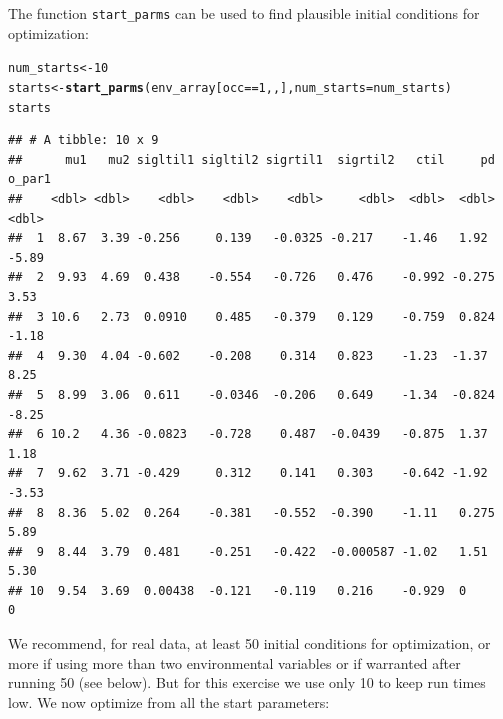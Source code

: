 \documentclass[11pt]{article}\usepackage[]{graphicx}\usepackage[]{xcolor}
\makeatletter
\newcommand{\hlnum}[1]{\textcolor[rgb]{0.686,0.059,0.569}{#1}}%
\newcommand{\hlopt}[1]{\textcolor[rgb]{0,0,0}{#1}}%
\newcommand{\hldef}[1]{\textcolor[rgb]{0.345,0.345,0.345}{#1}}%
\newcommand{\hlkwb}[1]{\textcolor[rgb]{0.69,0.353,0.396}{#1}}%
\newcommand{\hlkwc}[1]{\textcolor[rgb]{0.333,0.667,0.333}{#1}}%
\newcommand{\hlkwd}[1]{\textcolor[rgb]{0.737,0.353,0.396}{\textbf{#1}}}%
\newenvironment{kframe}{%
 \def\at@end@of@kframe{}%
 \ifinner\ifhmode%
  \def\at@end@of@kframe{\end{minipage}}%
  \begin{minipage}{\columnwidth}%
 \fi\fi%
 \def\FrameCommand##1{\hskip\@totalleftmargin \hskip-\fboxsep
 \colorbox{shadecolor}{##1}\hskip-\fboxsep
     \hskip-\linewidth \hskip-\@totalleftmargin \hskip\columnwidth}%
 \MakeFramed {\advance\hsize-\width
   \@totalleftmargin\z@ \linewidth\hsize
   \@setminipage}}%
 {\par\unskip\endMakeFramed%
 \at@end@of@kframe}
\newenvironment{knitrout}{}{} %
\makeatother
\begin{document}
The function \texttt{start\_parms} can be used to find plausible initial conditions
for optimization:
\begin{knitrout}
\color{fgcolor}\begin{kframe}
\begin{alltt}
\hldef{num_starts} \hlkwb{<-} \hlnum{10}
\hldef{starts} \hlkwb{<-} \hlkwd{start_parms}\hldef{(env_array[occ} \hlopt{==} \hlnum{1}\hldef{, , ],} \hlkwc{num_starts} \hldef{= num_starts)}
\hldef{starts}
\end{alltt}
\begin{verbatim}
## # A tibble: 10 x 9
##      mu1   mu2 sigltil1 sigltil2 sigrtil1  sigrtil2   ctil     pd o_par1
##    <dbl> <dbl>    <dbl>    <dbl>    <dbl>     <dbl>  <dbl>  <dbl>  <dbl>
##  1  8.67  3.39 -0.256     0.139   -0.0325 -0.217    -1.46   1.92   -5.89
##  2  9.93  4.69  0.438    -0.554   -0.726   0.476    -0.992 -0.275   3.53
##  3 10.6   2.73  0.0910    0.485   -0.379   0.129    -0.759  0.824  -1.18
##  4  9.30  4.04 -0.602    -0.208    0.314   0.823    -1.23  -1.37    8.25
##  5  8.99  3.06  0.611    -0.0346  -0.206   0.649    -1.34  -0.824  -8.25
##  6 10.2   4.36 -0.0823   -0.728    0.487  -0.0439   -0.875  1.37    1.18
##  7  9.62  3.71 -0.429     0.312    0.141   0.303    -0.642 -1.92   -3.53
##  8  8.36  5.02  0.264    -0.381   -0.552  -0.390    -1.11   0.275   5.89
##  9  8.44  3.79  0.481    -0.251   -0.422  -0.000587 -1.02   1.51    5.30
## 10  9.54  3.69  0.00438  -0.121   -0.119   0.216    -0.929  0       0
\end{verbatim}
\end{kframe}
\end{knitrout}
\noindent We recommend, for real data, at least 50 initial conditions for optimization, or more if using more than two
environmental variables or if warranted after running 50 (see below). But for this exercise we use only 10 
to keep run times low. 
We now optimize from all the start parameters:
\end{document}
